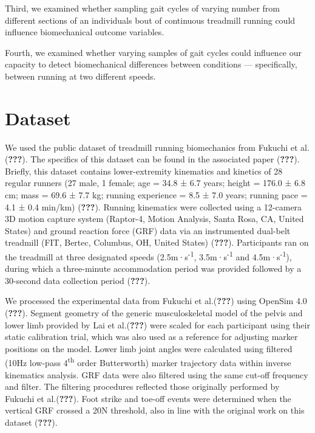 \documentclass[]{elsarticle} %
\begin{document}
Third, we examined whether sampling gait cycles of varying number from
different sections of an individuals bout of continuous treadmill
running could influence biomechanical outcome variables.

Fourth, we examined whether varying samples of gait cycles could
influence our capacity to detect biomechanical differences between
conditions --- specifically, between running at two different speeds.

\hypertarget{dataset}{%
\section{Dataset}\label{dataset}}

We used the public dataset of treadmill running biomechanics from
Fukuchi et al.({\textbf{???}}). The specifics of this dataset can be
found in the associated paper ({\textbf{???}}). Briefly, this dataset
contains lower-extremity kinematics and kinetics of 28 regular runners
(27 male, 1 female; age = 34.8 ± 6.7 years; height = 176.0 ± 6.8 cm;
mass = 69.6 ± 7.7 kg; running experience = 8.5 ± 7.0 years; running pace
= 4.1 ± 0.4 min/km) ({\textbf{???}}). Running kinematics were collected
using a 12-camera 3D motion capture system (Raptor-4, Motion Analysis,
Santa Rosa, CA, United States) and ground reaction force (GRF) data via
an instrumented dual-belt treadmill (FIT, Bertec, Columbus, OH, United
States) ({\textbf{???}}). Participants ran on the treadmill at three
designated speeds (2.5m·s\textsuperscript{-1},
3.5m·s\textsuperscript{-1} and 4.5m·s\textsuperscript{-1}), during which
a three-minute accommodation period was provided followed by a 30-second
data collection period ({\textbf{???}}).

We processed the experimental data from Fukuchi et al.({\textbf{???}})
using OpenSim 4.0 ({\textbf{???}}). Segment geometry of the generic
musculoskeletal model of the pelvis and lower limb provided by Lai et
al.({\textbf{???}}) were scaled for each participant using their static
calibration trial, which was also used as a reference for adjusting
marker positions on the model. Lower limb joint angles were calculated
using filtered (10Hz low-pass 4\textsuperscript{th} order Butterworth)
marker trajectory data within inverse kinematics analysis. GRF data were
also filtered using the same cut-off frequency and filter. The filtering
procedures reflected those originally performed by Fukuchi et
al.({\textbf{???}}). Foot strike and toe-off events were determined when
the vertical GRF crossed a 20N threshold, also in line with the original
work on this dataset ({\textbf{???}}).
\end{document}
